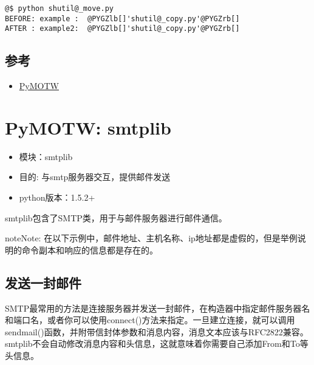 \documentclass[letterpaper,10pt,english]{manual}
\begin{document}
\begin{Verbatim}[commandchars=@\[\]]
@$ python shutil@_move.py
BEFORE: example :  @PYGZlb[]'shutil@_copy.py'@PYGZrb[]
AFTER : example2:  @PYGZlb[]'shutil@_copy.py'@PYGZrb[]
\end{Verbatim}


\subsection{参考}
\begin{itemize}
\item {} 
\href{http://tc-nsop-test2.tc.baidu.com:3129/documents}{PyMOTW}

\end{itemize}

\resetcurrentobjects


\section{PyMOTW: smtplib}
\begin{itemize}
\item {} 
模块：smtplib

\item {} 
目的: 与smtp服务器交互，提供邮件发送

\item {} 
python版本：1.5.2+

\end{itemize}

smtplib包含了SMTP类，用于与邮件服务器进行邮件通信。

\begin{notice}{note}{Note:}
在以下示例中，邮件地址、主机名称、ip地址都是虚假的，但是举例说明的命令副本和响应的信息都是存在的。
\end{notice}


\subsection{发送一封邮件}

SMTP最常用的方法是连接服务器并发送一封邮件，在构造器中指定邮件服务器名和端口名，或者你可以使用connect()方法来指定。一旦建立连接，就可以调用sendmail()函数，并附带信封体参数和消息内容，消息文本应该与RFC2822兼容。smtplib不会自动修改消息内容和头信息，这就意味着你需要自己添加From和To等头信息。
\end{document}
